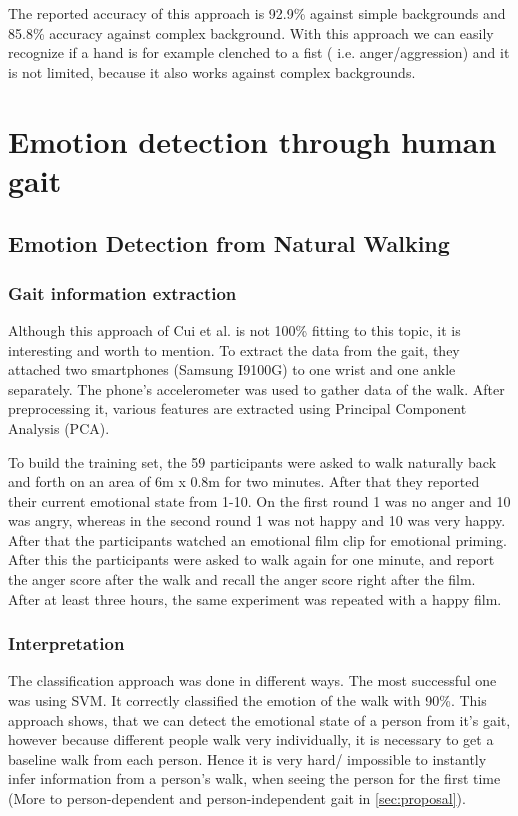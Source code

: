 \documentclass[conference]{IEEEtran}
\begin{document}
The reported accuracy of this approach is 92.9\% against simple backgrounds and 85.8\% accuracy against complex background.
With this approach we can easily recognize if a hand is for example clenched to a fist ( i.e. anger/aggression) and it is not  limited, because it also works against complex backgrounds.

\section{Emotion detection through human gait}
\label{sec:emotionGait}
\subsection{Emotion Detection from Natural Walking}
\label{subsec:EDNW}
\subsubsection{Gait information extraction}
Although this approach of Cui et al.\cite{cui2016emotion} is not 100\% fitting to this topic, it is interesting and worth to mention. To extract the data from the gait, they attached two smartphones (Samsung I9100G) to one wrist and one ankle separately\cite{cui2016emotion}.  The phone's accelerometer was used to gather data of the walk. After preprocessing it, various features are extracted using Principal Component Analysis (PCA).\

To build the training set, the 59 participants were asked to walk naturally back and forth on an area of 6m x 0.8m for two minutes\cite{cui2016emotion}. After that they reported their current emotional state from 1-10. On the first round 1 was no anger and 10 was angry, whereas in the second round 1 was not happy and 10 was very happy.  After that the participants watched an emotional film clip for emotional priming. After this the participants were asked to walk again for one minute, and report the anger score after the walk and recall the anger score right after the film.  After at least three hours, the same experiment was repeated with a happy film. 
\subsubsection{Interpretation}
The classification approach was done in different ways. The most successful one was using SVM. It correctly classified the emotion of the walk with 90\%. 
This approach shows, that we can detect the emotional state of a person from it's gait, however because different people walk very individually, it is necessary to get a baseline walk from each person. Hence it is very hard/ impossible to instantly infer information from a person's walk, when seeing the person for the first time (More to person-dependent and person-independent gait in \autoref{sec:proposal}).
\end{document}
